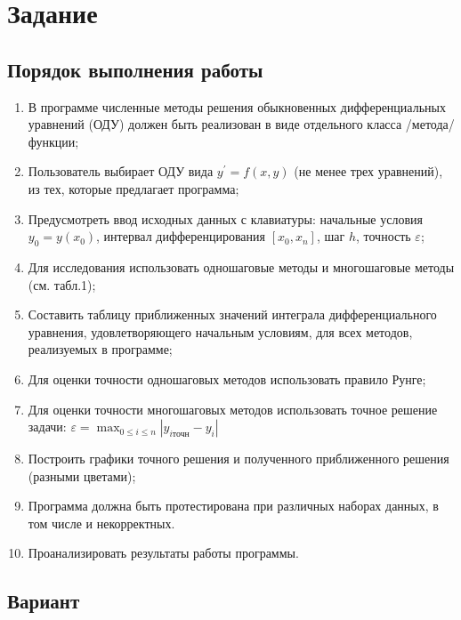 \documentclass{article}
\begin{document}
\itmo[
      variant=13,
      labn=6,
      discipline=Вычислительная математика,
      group=P3212,
      student=Соколов Анатолий Владимирович,
      teacher=Наумова Надежда Александровна 
]
\lstset{language=rust}
\tableofcontents
\section{Задание}
      \subsection{Порядок выполнения работы}
      	\begin{enumerate}
			\item В программе численные методы решения обыкновенных дифференциальных уравнений (ОДУ) должен быть реализован в виде отдельного класса /метода/функции;
			\item Пользователь выбирает ОДУ вида $y^\prime=f(x,y)$ (не менее трех уравнений), из тех, которые предлагает программа;
			\item Предусмотреть ввод исходных данных с клавиатуры: начальные условия $y_0=y(x_0)$, интервал дифференцирования $[x_0,x_n]$, шаг $h$, точность $\varepsilon$;
			\item Для исследования использовать одношаговые методы и многошаговые методы (см. табл.1);
			\item Составить таблицу приближенных значений интеграла дифференциального уравнения, удовлетворяющего начальным условиям, для всех методов, реализуемых в программе;
			\item Для оценки точности одношаговых методов использовать правило Рунге;
			\item Для оценки точности многошаговых методов использовать точное решение задачи: $\varepsilon = \max_{0\leq i \leq n}|y_{i \text{точн}}-y_i|$
			\item Построить графики точного решения и полученного приближенного решения (разными цветами);
			\item Программа должна быть протестирована при различных наборах данных, в том числе и некорректных.
			\item  Проанализировать результаты работы программы.
     	\end{enumerate}       
\subsection{Вариант}
\end{document}
